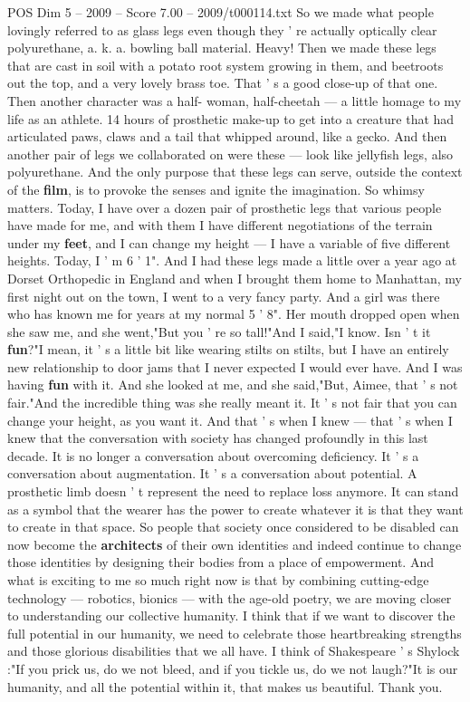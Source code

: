 \begin{textsample}{POS Dim 5 – 2009 – Score 7.00 – 2009/t000114.txt}
So we made what people lovingly referred to as glass legs even though they ' re actually optically clear polyurethane, a. k. a. bowling ball material.
Heavy!
Then we made these legs that are cast in soil with a potato root system growing in them, and beetroots out the top, and a very lovely brass toe.
That ' s a good close-up of that one.
Then another character was a half- woman, half-cheetah — a little homage to my life as an athlete. 14 hours of prosthetic make-up to get into a creature that had articulated paws, claws and a tail that whipped around, like a gecko.
And then another pair of legs we collaborated on were these — look like jellyfish legs, also polyurethane.
And the only purpose that these legs can serve, outside the context of the \textbf{film}, is to provoke the senses and ignite the imagination.
So whimsy matters.
Today, I have over a dozen pair of prosthetic legs that various people have made for me, and with them I have different negotiations of the terrain under my \textbf{feet}, and I can change my height — I have a variable of five different heights.
Today, I ' m 6 ' 1".
And I had these legs made a little over a year ago at Dorset Orthopedic in England and when I brought them home to Manhattan, my first night out on the town, I went to a very fancy party.
And a girl was there who has known me for years at my normal 5 ' 8".
Her mouth dropped open when she saw me, and she went,"But you ' re so tall!"And I said,"I know.
Isn ' t it \textbf{fun}?"I mean, it ' s a little bit like wearing stilts on stilts, but I have an entirely new relationship to door jams that I never expected I would ever have.
And I was having \textbf{fun} with it.
And she looked at me, and she said,"But, Aimee, that ' s not fair."And the incredible thing was she really meant it.
It ' s not fair that you can change your height, as you want it.
And that ' s when I knew — that ' s when I knew that the conversation with society has changed profoundly in this last decade.
It is no longer a conversation about overcoming deficiency.
It ' s a conversation about augmentation.
It ' s a conversation about potential.
A prosthetic limb doesn ' t represent the need to replace loss anymore.
It can stand as a symbol that the wearer has the power to create whatever it is that they want to create in that space.
So people that society once considered to be disabled can now become the \textbf{architects} of their own identities and indeed continue to change those identities by designing their bodies from a place of empowerment.
And what is exciting to me so much right now is that by combining cutting-edge technology — robotics, bionics — with the age-old poetry, we are moving closer to understanding our collective humanity.
I think that if we want to discover the full potential in our humanity, we need to celebrate those heartbreaking strengths and those glorious disabilities that we all have.
I think of Shakespeare ' s Shylock :"If you prick us, do we not bleed, and if you tickle us, do we not laugh?"It is our humanity, and all the potential within it, that makes us beautiful.
Thank you.

\end{textsample}
